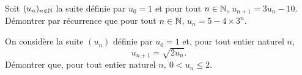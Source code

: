 \documentclass[a4paper,11pt,DIV20,BCOR0mm]{scrartcl}
\begin{document}
\begin{exercice}
Soit $(u_n)_{n\in\mathbb{N}}$ la suite définie par $u_0=1$ et pour tout $n\in\mathbb{N}$, 
$u_{n+1}=3u_n-10$. Démontrer par récurrence que pour tout $n\in\mathbb{N}$,
$u_n=5-4\times 3^n$.
\end{exercice}

\vfill

\begin{exercice}
On considère la suite $\left(u_{n}\right)$ définie par $u_{0} = 1$ et, pour tout entier naturel $n$,
\[ u_{n+1} = \sqrt{2u_{n}}.\]
Démontrer que, pour tout entier naturel $n,\: 0 < u_{n} \leqslant 2$.
\end{exercice}

\vfill
\end{document}
